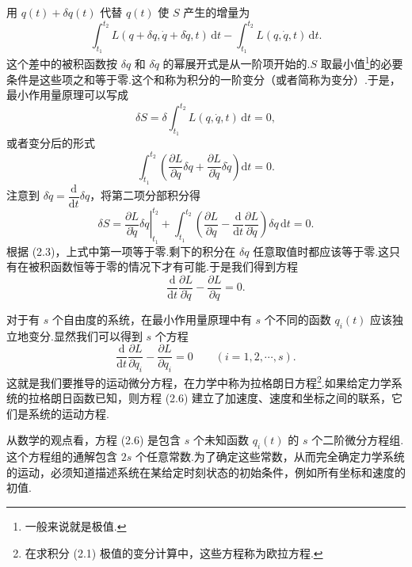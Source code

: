 用 $q(t)+\delta q(t)$ 代替 $q(t)$ 使 $S$ 产生的增量为
\begin{equation*}
  \int_{t_1}^{t_2} L(q+\delta q,\dot{q}+\delta\dot{q},t)\,\mathrm{d}t
  -\int_{t_1}^{t_2} L(q,\dot{q},t)\,\mathrm{d}t.
\end{equation*}
这个差中的被积函数按 $\delta q$ 和 $\delta\dot{q}$ 的幂展开式是从一阶项开始的.$S$ 取最小值\footnote{一般来说就是极值.}的必要条件是这些项之和等于零.这个和称为积分的一阶变分（或者简称为变分）.于是，最小作用量原理可以写成
\begin{equation}
  \delta S=\delta\int_{t_1}^{t_2} L(q,\dot{q},t)\,\mathrm{d}t=0,
\end{equation}
或者变分后的形式
\begin{equation*}
  \int_{t_1}^{t_2}\left(\frac{\partial L}{\partial q}\delta q
  +\frac{\partial L}{\partial\dot{q}}\delta\dot{q}\right)\mathrm{d}t=0.
\end{equation*}
注意到 $\delta\dot{q}=\dfrac{\mathrm{d}}{\mathrm{d}t}\delta q$，将第二项分部积分得
\begin{equation}
  \delta S=\left.\frac{\partial L}{\partial\dot{q}}\delta q\right|_{t_1}^{t_2}
  +\int_{t_1}^{t_2}\left(\frac{\partial L}{\partial q}
  -\frac{\mathrm{d}}{\mathrm{d}t}\frac{\partial L}{\partial\dot{q}}\right)\delta q\,\mathrm{d}t=0.
\end{equation}
根据 (2.3)，上式中第一项等于零.剩下的积分在 $\delta q$ 任意取值时都应该等于零.这只有在被积函数恒等于零的情况下才有可能.于是我们得到方程
\begin{equation*}
  \frac{\mathrm{d}}{\mathrm{d}t}\frac{\partial L}{\partial\dot{q}}
  -\frac{\partial L}{\partial q}=0.
\end{equation*}

对于有 $s$ 个自由度的系统，在最小作用量原理中有 $s$ 个不同的函数 $q_i(t)$ 应该独立地变分.显然我们可以得到 $s$ 个方程
\begin{equation}
  \frac{\mathrm{d}}{\mathrm{d}t}\frac{\partial L}{\partial\dot{q}_i}
  -\frac{\partial L}{\partial q_i}=0
  \qquad(i=1,2,\cdots,s).
\end{equation}
这就是我们要推导的运动微分方程，在力学中称为拉格朗日方程\footnote{在求积分 (2.1) 极值的变分计算中，这些方程称为欧拉方程.}.如果给定力学系统的拉格朗日函数已知，则方程 (2.6) 建立了加速度、速度和坐标之间的联系，它们是系统的运动方程.

从数学的观点看，方程 (2.6) 是包含 $s$ 个未知函数 $q_i(t)$ 的 $s$ 个二阶微分方程组.这个方程组的通解包含 $2s$ 个任意常数.为了确定这些常数，从而完全确定力学系统的运动，必须知道描述系统在某给定时刻状态的初始条件，例如所有坐标和速度的初值.

